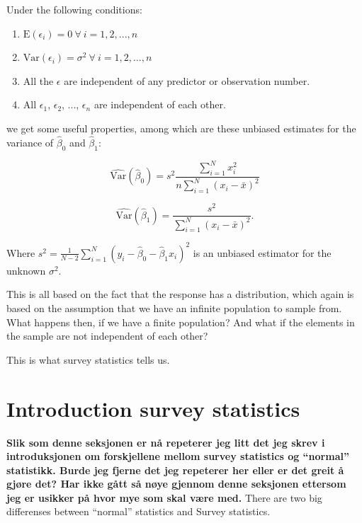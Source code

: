 \documentclass{article}
\begin{document}
Under the following conditions:

\begin{enumerate}
\item \(\mathrm{E} \left( \epsilon_i \right) = 0\ \forall \ i = 1, 2, ..., n\)
\item \(\mathrm{Var} \left( \epsilon_i \right) = \sigma^2\ \forall \ i = 1, 2, ..., n\)
\item All the \(\epsilon\) are independent of any predictor or observation number.
\item All \(\epsilon_1\), \(\epsilon_2\), ..., \(\epsilon_n\) are independent of each other.
\end{enumerate}

we get some useful properties, among which are these unbiased estimates for the
variance of \(\hat{\beta}_0\) and \(\hat{\beta}_1\):

\begin{equation*}
  \widehat{\mathrm{Var}} \left( \hat{\beta}_0 \right) = s^2 \frac{\sum_{i = 1}^N x_i^2}{n
    \sum_{i = 1}^N \left( x_i - \bar{x} \right)^2}
\end{equation*}
  

\begin{equation*}
  \widehat{\mathrm{Var}} \left( \hat{\beta}_1 \right) = \frac{s^2}{
    \sum_{i = 1}^N \left( x_i - \bar{x} \right)^2}.
\end{equation*}

Where \(s^2 = \frac{1}{N - 2} \sum_{i = 1}^N\left( y_i - \hat{\beta}_0 -
  \hat{\beta}_1 x_i \right)^2\) is an
unbiased estimator for the unknown \(\sigma^2\).

This is all based on the fact that the response has a distribution, which again
is based on the assumption that we have an infinite population to sample from.
What happens then, if we have a finite population? And what if the elements in
the sample are not independent of each other?

This is what survey statistics tells us.

\section{Introduction survey statistics}

\textbf{Slik som denne seksjonen er nå repeterer jeg litt det jeg skrev i
  introduksjonen om forskjellene mellom survey statistics og ``normal''
  statistikk. Burde jeg fjerne det jeg repeterer her eller er det greit å gjøre
  det?
Har ikke gått så nøye gjennom denne seksjonen ettersom jeg er usikker på hvor
mye som skal være med.}
There are two big differenses between ``normal'' statistics and Survey statistics.
\end{document}
